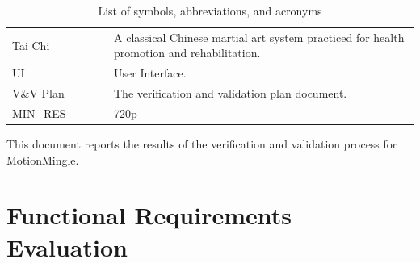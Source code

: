 \documentclass[12pt, titlepage]{article}
\begin{document}
\begin{table}[H]
\begin{tabular}{L{0.25\linewidth}L{0.8\linewidth}}
    Tai Chi                    & A classical Chinese martial art system practiced for health promotion and rehabilitation.                                                                                          \\
    UI                         & User Interface.                                                                                                                                                                    \\
    V\&V Plan                  & The verification and validation plan document.                                                                                                                                     \\
    MIN\_RES \label{const:res} & 720p                                                                                                                                                                               \\ \bottomrule
  \end{tabular}
  \caption{List of symbols, abbreviations, and acronyms}
  \label{tab:abbrv}
\end{table}

\newpage

\tableofcontents

\listoftables %

\listoffigures %

\newpage


This document reports the results of the verification and validation process for
MotionMingle.

\section{Functional Requirements Evaluation}
\end{document}
